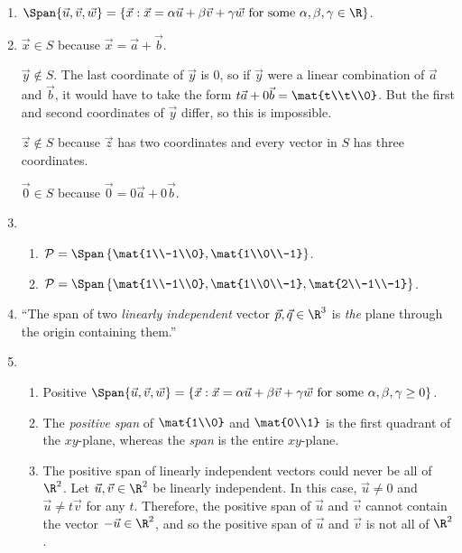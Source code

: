 
\begin{enumerate}
			\item $\Span\{\vec u,\vec v,\vec w\}=\{\vec x:\vec x=\alpha\vec u+\beta\vec v+\gamma \vec w\text{ for some }\alpha,\beta,\gamma\in \R\}$.
			\item $\vec x\in S$ because $\vec x=\vec a+\vec b$.
				
				$\vec y\notin S$. The last coordinate of $\vec y$ is $0$, so if $\vec y$ were a linear combination of
				$\vec a$ and $\vec b$, it would have to take the form $t\vec a+0\vec b=\mat{t\\t\\0}$. But the first
				and second coordinates of $\vec y$ differ, so this is impossible.

				$\vec z\notin S$ because $\vec z$ has two coordinates and every vector in $S$ has three
				coordinates.
				
				$\vec 0\in S$ because $\vec 0=0\vec a+0\vec b$.
			\item \begin{enumerate}
					\item $\mathcal P=\Span\left\{\mat{1\\-1\\0},\mat{1\\0\\-1}\right\}$.
					\item $\mathcal P=\Span\left\{\mat{1\\-1\\0},\mat{1\\0\\-1}, \mat{2\\-1\\-1}\right\}$.
			\end{enumerate}
			\item ``The span of two \emph{linearly independent} vector $\vec p,\vec q\in \R^3$ is \emph{the} plane through
				the origin containing them.''
			\item \begin{enumerate}
				\item Positive $\Span\{\vec u,\vec v,\vec w\}=\{\vec x:\vec x=\alpha\vec u+\beta\vec v+\gamma \vec w\text{ for some }\alpha,\beta,\gamma\geq 0\}$.
				\item The \emph{positive span} of $\mat{1\\0}$ and $\mat{0\\1}$ is the first quadrant of the $xy$-plane, whereas
					the \emph{span} is the entire $xy$-plane.
				\item The positive span of linearly independent vectors could never be all of $\R^2$.
					Let $\vec u,\vec v\in \R^2$ be linearly independent.
					In this case, $\vec u\neq 0$ and $\vec u\neq t\vec v$ for any $t$.
					Therefore, the positive span of $\vec u$ and $\vec v$ cannot contain the vector $-\vec u\in \R^2$,
					and so the positive span of $\vec u$ and $\vec v$ is not all of $\R^2$.


\end{enumerate}
\end{enumerate}

